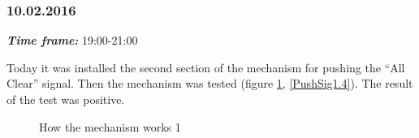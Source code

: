 \subsubsection{10.02.2016}
\textit{\textbf{Time frame:}} 19:00-21:00 

Today it was installed the second section of the mechanism for pushing the “All Clear” signal. Then the mechanism was tested (figure \ref{PushSig1.3}, \ref{PushSig1.4}). The result of the test was positive.

\begin{figure}[H]
	\begin{minipage}[h]{0.47\linewidth}
		\caption{How the mechanism works 1}
		\label{PushSig1.3}
	\end{minipage}
	\hfill
	\begin{minipage}[h]{0.47\linewidth}

\end{minipage}
\end{figure}

